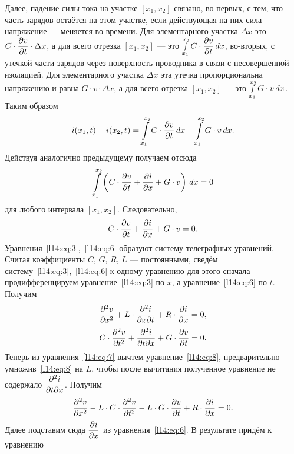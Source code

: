 Далее, падение силы тока на участке $[x_1,x_2]$ связано, во-первых, с тем, что часть зарядов остаётся на этом участке, если действующая на них сила --- напряжение --- меняется во времени. Для элементарного участка $\Delta x$ это  $\displaystyle C\cdot\frac{\partial v}{\partial t}\cdot\Delta x$, а для всего отрезка $[x_1,x_2]$ --- это $\displaystyle\smallint\limits_{x_1}^{x_2}C\cdot\frac{\partial v}{\partial t}\,dx$,	во-вторых, с утечкой части зарядов через поверхность проводника в связи с несовершенной изоляцией. Для элементарного участка $\Delta x$ эта утечка пропорциональна напряжению и равна $G\cdot v\cdot\Delta x$, а для всего отрезка $[x_1,x_2]$ --- это $\displaystyle\smallint\limits_{x_1}^{x_2}G\cdot v\,dx$.
Таким образом 
\begin{equation}\label{l14:eq:4}
	 i(x_1,t)-i(x_2,t)=\int\limits_{x_1}^{x_2}C\cdot\frac{\partial v}{\partial t}\,dx+\int\limits_{x_1}^{x_2}G\cdot v\,dx.
\end{equation} 
Действуя аналогично предыдущему получаем отсюда
\begin{equation}\label{l14:eq:5}
	 \int\limits_{x_1}^{x_2}\left(C\cdot\frac{\partial v}{\partial t}+\frac{\partial i}{\partial x}+G\cdot v\right)\,dx=0
\end{equation} 
для любого интервала $[x_1,x_2]$. Следовательно,
\begin{equation}\label{l14:eq:6}
	 C\cdot\frac{\partial v}{\partial t}+\frac{\partial i}{\partial x}+G\cdot v=0.
\end{equation}  
Уравнения~\eqref{l14:eq:3},~\eqref{l14:eq:6} образуют систему телеграфных уравнений. Считая коэффициенты $C$, $G$, $R$, $L$ --- постоянными, сведём систему~\eqref{l14:eq:3},~\eqref{l14:eq:6} к одному уравнению для этого сначала продифференцируем уравнение~\eqref{l14:eq:3} по $x$, а уравнение~\eqref{l14:eq:6} по $t$. Получим 
\begin{equation}\label{l14:eq:7}
	 \frac{\partial^2v}{\partial x^2}+L\cdot\frac{\partial^2i}{\partial x\partial t}+R\cdot \frac{\partial i}{\partial x}=0,
\end{equation}
\begin{equation}\label{l14:eq:8}
	 C\cdot\frac{\partial^2v}{\partial t^2}+\frac{\partial^2i}{\partial t\partial x}+G\cdot \frac{\partial v}{\partial t}=0.
\end{equation} 
Теперь из уравнения~\eqref{l14:eq:7} вычтем уравнение~\eqref{l14:eq:8}, предварительно умножив~\eqref{l14:eq:8} на $L$, чтобы после вычитания полученное уравнение не содержало $\displaystyle\frac{\partial^2i}{\partial t\partial x}$. Получим
\begin{equation}\label{l14:eq:9}
	 \frac{\partial^2v}{\partial x^2}-L\cdot C\cdot\frac{\partial^2v}{\partial t^2}-L\cdot G\cdot \frac{\partial v}{\partial t}+R\cdot \frac{\partial i}{\partial x}=0.
\end{equation} 
Далее подставим сюда $\displaystyle\frac{\partial i}{\partial x}$ из уравнения~\eqref{l14:eq:6}. В результате придём к уравнению

